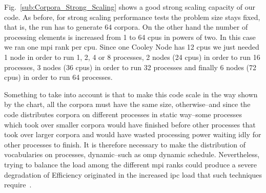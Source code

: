 \documentclass[10pt,journal,compsoc]{IEEEtran}
\begin{document}

Fig.~\ref{sub:Corpora_Strong_Scaling} shows a good strong scaling capacity of our code. As before, for strong scaling performance tests the problem size stays fixed, that is, the run has to generate 64 corpora. On the other hand the number of processing elements is increased from 1 to 64 \glspl{cpu} in powers of two. In this case we ran one \gls{mpi} rank per \gls{cpu}. Since one Cooley Node has 12 \glspl{cpu} we just needed 1 node in order to run 1, 2, 4 or 8 processes, 2 nodes (24 \glspl{cpu}) in order to run 16 processes, 3 nodes (36 \glspl{cpu}) in order to run 32 processes and finally 6 nodes (72 \glspl{cpu}) in order to run 64 processes.


Something to take into account is that to make this code scale in the way shown by the chart, all the corpora must have the same size, otherwise--and since the code distributes corpora on different processes in static way--some processes which took over smaller corpora would have finished before other processes that took over larger corpora and would have wasted processing power waiting idly for other processes to finish. It is therefore necessary to make the distribution of vocabularies on processes, dynamic--such as \gls{omp} dynamic schedule. Nevertheless, trying to balance the load among the different \gls{mpi} ranks could produce a severe degradation of Efficiency originated in the increased \gls{ipc} load that such techniques require~\cite{hu2012biophysically}.
\end{document}
